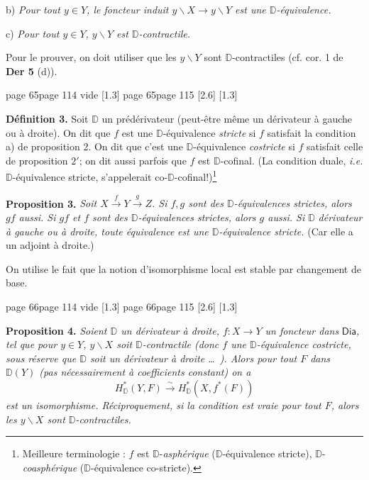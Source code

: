 \documentclass[11pt,leqno]{article}
\newcommand{\printedpage}[1]{\marginnote{\scriptsize\sffamily ed.\ #1}}
\newcommand{\msp}[1]{%
  \begingroup\def\thismsp{#1}\def\blankmsp{page 114 vide}%
  \ifx\thismsp\blankmsp
    \marginnote{\scriptsize\sffamily [114: vide]}[1.3\baselineskip]%
  \else\def\followingmsp{page 115}%
    \ifx\thismsp\followingmsp
      \marginnote{\scriptsize\sffamily [page 115]}[2.6\baselineskip]%
    \else\marginnote{\scriptsize\sffamily [#1]}[1.3\baselineskip]\fi
  \fi\endgroup}
\newcommand{\DD}{\ensuremath{\mathbb{D}}}
\newcommand{\Dia}{\ensuremath{\mathsf{Dia}}}
\newcommand{\isolongto}{\overset{\sim}{\longrightarrow}}
\begin{document}
b) \textit{Pour tout $y \in Y$, le foncteur induit $y\backslash X \to y\backslash Y$ est une $\DD$-équivalence.}

c) \textit{Pour tout $y \in Y$, $y\backslash Y$ est $\DD$-contractile.}

\noindent Pour le prouver, on doit utiliser que les $y\backslash Y$ sont $\DD$-contractiles (cf. cor. 1 de \textbf{Der 5} (d)).

\clearpage
\printedpage{38}
\noindent\msp{page 65}

\noindent\textbf{Définition 3.} Soit $\DD$ un prédérivateur (peut-être même un dérivateur à gauche ou à droite). On dit que $f$ est une $\DD$-équivalence \textit{stricte} si $f$ satisfait la condition a) de proposition 2. On dit que c'est une $\DD$-équivalence \textit{costricte} si $f$ satisfait celle de proposition $2'$; on dit aussi parfois que $f$ est $\DD$-cofinal. (La condition duale, \textit{i.e.} $\DD$-équivalence stricte, s'appelerait co-$\DD$-cofinal!)\footnote[27]{Meilleure terminologie : $f$ est $\DD$-\textit{asphérique} ($\DD$-équivalence stricte), $\DD$-\textit{coasphérique} ($\DD$-équivalence co-stricte).} %

\noindent\textbf{Proposition 3.} \textit{Soit $X \overset{f}{\to} Y \overset{g}{\to} Z$. Si $f, g$ sont des $\DD$-équivalences strictes, alors $gf$ aussi. Si $gf$ et $f$ sont des $\DD$-équivalences strictes, alors $g$ aussi. Si $\DD$} \textit{dérivateur à gauche ou à droite, toute équivalence} \textit{est une $\DD$-équivalence stricte.} (Car elle a un adjoint à droite.)

On utilise le fait que la notion d'isomorphisme local est stable par changement de base.

\noindent\msp{page 66}

\noindent\textbf{Proposition 4.} \textit{Soient $\DD$ un dérivateur à droite, $f : X \to Y$ un foncteur dans} $\Dia$\textit{, tel que pour $y \in Y$, $y\backslash X$ soit $\DD$-contractile (donc $f$ une $\DD$-équivalence costricte, sous réserve que $\DD$ soit un dérivateur à droite \ldots\ ). Alors pour tout $F$ dans $\DD(Y)$ (pas nécessairement à coefficients constant) on a} %
\[
H^*_{\DD}(Y, F) \isolongto H^*_{\DD}(X, f^*(F))
\]
\textit{est un isomorphisme. Réciproquement, si la condition est vraie pour tout $F$, alors les $y\backslash X$ sont $\DD$-contractiles.}
\end{document}
